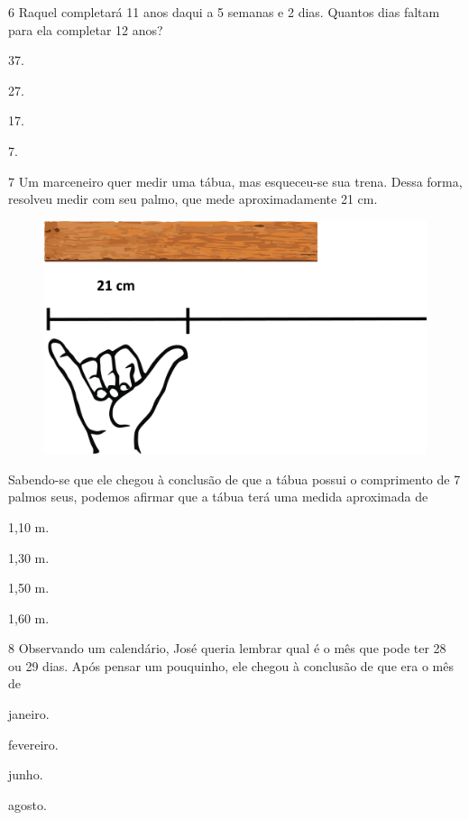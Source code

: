 \num{6} Raquel completará 11 anos daqui a 5 semanas e 2 dias. Quantos dias faltam para ela completar 12 anos?

\begin{multicols}{2}
\begin{escolha}
\item
  37.
\item
  27.
\item
  17.
\item
  7.
\end{escolha}
\end{multicols}

\num{7} Um marceneiro quer medir uma tábua, mas esqueceu-se sua trena. Dessa forma, resolveu medir com seu palmo, que mede aproximadamente 21 cm.

\begin{figure}[htpb!]
\centering
\includegraphics[width=.5\textwidth]{./media/image104.png}
\end{figure}

Sabendo-se que ele chegou à conclusão de que a tábua possui o comprimento de 7 palmos seus, podemos afirmar que a tábua terá uma medida aproximada de

\begin{multicols}{2}
\begin{escolha}
\item
  1,10 m.
\item
  1,30 m.
\item
  1,50 m.
\item
  1,60 m.
\end{escolha}
\end{multicols}

\pagebreak
\num{8} Observando um calendário, José queria lembrar qual é o mês que pode ter 28 ou 29 dias. Após pensar um pouquinho, ele chegou à conclusão de que era o mês de

\begin{escolha}
\item
  janeiro.
\item
  fevereiro.
\item
  junho.
\item
  agosto.
\end{escolha}

